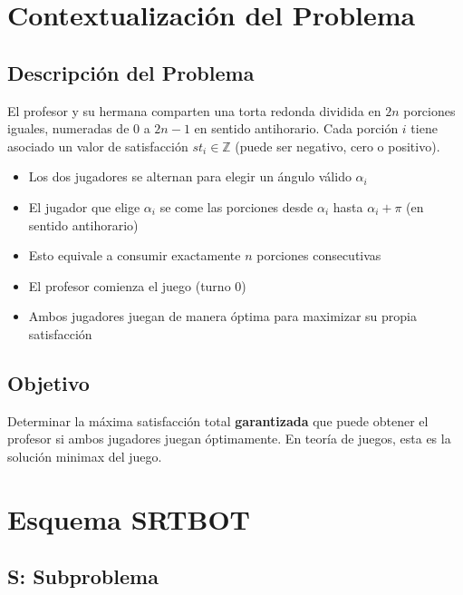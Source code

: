 \documentclass[12pt,letterpaper]{article}
\begin{document}
\section{Contextualización del Problema}

\subsection{Descripción del Problema}

El profesor y su hermana comparten una torta redonda dividida en $2n$ porciones iguales, numeradas de $0$ a $2n-1$ en sentido antihorario. Cada porción $i$ tiene asociado un valor de satisfacción $st_i \in \mathbb{Z}$ (puede ser negativo, cero o positivo).

\begin{itemize}
    \item Los dos jugadores se alternan para elegir un ángulo válido $\alpha_i$
    \item El jugador que elige $\alpha_i$ se come las porciones desde $\alpha_i$ hasta $\alpha_i + \pi$ (en sentido antihorario)
    \item Esto equivale a consumir exactamente $n$ porciones consecutivas
    \item El profesor comienza el juego (turno 0)
    \item Ambos jugadores juegan de manera óptima para maximizar su propia satisfacción
\end{itemize}

\subsection{Objetivo}

Determinar la máxima satisfacción total \textbf{garantizada} que puede obtener el profesor si ambos jugadores juegan óptimamente. En teoría de juegos, esta es la solución minimax del juego.

\section{Esquema SRTBOT}

\subsection{S: Subproblema}
\end{document}
